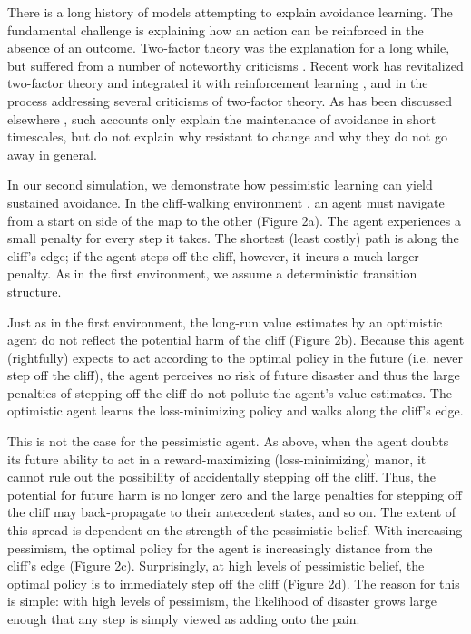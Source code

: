\documentclass[11pt]{article} %
\begin{document}
There is a long history of models attempting to explain avoidance learning. The fundamental challenge is explaining how an action can be reinforced in the absence of an outcome. Two-factor theory was the explanation for a long while, but suffered from a number of noteworthy criticisms \citep{Krypotos2015}. Recent work has revitalized two-factor theory and integrated it with reinforcement learning \citep{Moutoussis2008, Maia2010}, and in the process addressing several criticisms of two-factor theory. As has been discussed elsewhere \citep{Moutoussis2017}, such accounts only explain the maintenance of avoidance in short timescales, but do not explain why resistant to change and why they do not go away in general.

In our second simulation, we demonstrate how pessimistic learning can yield sustained avoidance. In the cliff-walking environment \citep{SuttonBarto1998, SuttonBarto2018, Gaskett2003}, an agent must navigate from a start on side of the map to the other (Figure 2a). The agent experiences a small penalty for every step it takes. The shortest (least costly) path is along the cliff's edge; if the agent steps off the cliff, however, it incurs a much larger penalty. As in the first environment, we assume a deterministic transition structure.

Just as in the first environment, the long-run value estimates by an optimistic agent do not reflect the potential harm of the cliff (Figure 2b). Because this agent (rightfully) expects to act according to the optimal policy in the future (i.e. never step off the cliff), the agent perceives no risk of future disaster and thus the large penalties of stepping off the cliff do not pollute the agent's value estimates. The optimistic agent learns the loss-minimizing policy and walks along the cliff's edge.

This is not the case for the pessimistic agent. As above, when the agent doubts its future ability to act in a reward-maximizing (loss-minimizing) manor, it cannot rule out the possibility of accidentally stepping off the cliff. Thus, the potential for future harm is no longer zero and the large penalties for stepping off the cliff may back-propagate to their antecedent states, and so on. The extent of this spread is dependent on the strength of the pessimistic belief. With increasing pessimism, the optimal policy for the agent is increasingly distance from the cliff's edge (Figure 2c). Surprisingly, at high levels of pessimistic belief, the optimal policy is to immediately step off the cliff (Figure 2d). The reason for this is simple: with high levels of pessimism, the likelihood of disaster grows large enough that any step is simply viewed as adding onto the pain.
\end{document}
